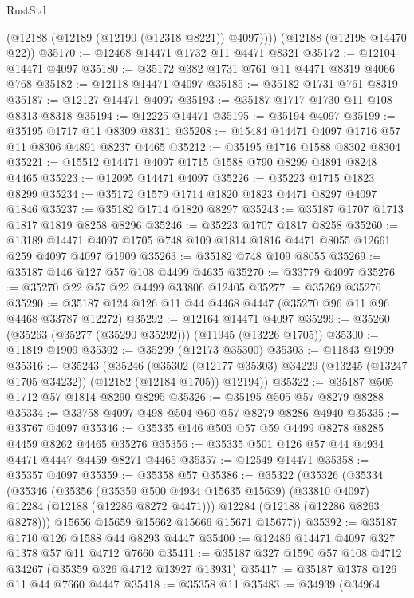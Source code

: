 \begin{lexlean}{RustStd}
\begin{coremodule}
        (@12188 (@12189 (@12190 (@12318 @8221)) @4097))))
    (@12188 (@12198 @14470 @22))
@35170 := @12468 @14471 @1732 @11 @4471 @8321
@35172 := @12104 @14471 @4097
@35180 := @35172 @382 @1731 @761 @11 @4471 @8319 @4066 @768
@35182 := @12118 @14471 @4097
@35185 := @35182 @1731 @761 @8319
@35187 := @12127 @14471 @4097
@35193 := @35187 @1717 @1730 @11 @108 @8313 @8318
@35194 := @12225 @14471
@35195 := @35194 @4097
@35199 := @35195 @1717 @11 @8309 @8311
@35208 := @15484 @14471 @4097 @1716 @57 @11 @8306 @4891 @8237 @4465
@35212 := @35195 @1716 @1588 @8302 @8304
@35221 := @15512 @14471 @4097 @1715 @1588 @790 @8299 @4891 @8248 @4465
@35223 := @12095 @14471 @4097
@35226 := @35223 @1715 @1823 @8299
@35234 := @35172 @1579 @1714 @1820 @1823 @4471 @8297 @4097 @1846
@35237 := @35182 @1714 @1820 @8297
@35243 := @35187 @1707 @1713 @1817 @1819 @8258 @8296
@35246 := @35223 @1707 @1817 @8258
@35260 := @13189 @14471 @4097 @1705 @748 @109 @1814 @1816 @4471 @8055 @12661 @259 @4097 @4097 @1909
@35263 := @35182 @748 @109 @8055
@35269 := @35187 @146 @127 @57 @108 @4499 @4635
@35270 := @33779 @4097
@35276 := @35270 @22 @57 @22 @4499 @33806 @12405
@35277 := @35269 @35276
@35290 := @35187 @124 @126 @11 @44 @4468 @4447 (@35270 @96 @11 @96 @4468 @33787 @12272)
@35292 := @12164 @14471 @4097
@35299 := @35260 (@35263 (@35277 (@35290 @35292))) (@11945 (@13226 @1705))
@35300 := @11819 @1909
@35302 := @35299 (@12173 @35300)
@35303 := @11843 @1909
@35316 := @35243
    (@35246
      (@35302 (@12177 @35303) @34229 (@13245 (@13247 @1705 @34232)) (@12182 (@12184 @1705)) @12194))
@35322 := @35187 @505 @1712 @57 @1814 @8290 @8295
@35326 := @35195 @505 @57 @8279 @8288
@35334 := @33758 @4097 @498 @504 @60 @57 @8279 @8286 @4940
@35335 := @33767 @4097
@35346 := @35335 @146 @503 @57 @59 @4499 @8278 @8285 @4459 @8262 @4465 @35276
@35356 := @35335 @501 @126 @57 @44 @4934 @4471 @4447 @4459 @8271 @4465
@35357 := @12549 @14471
@35358 := @35357 @4097
@35359 := @35358 @57
@35386 := @35322
    (@35326
      (@35334
        (@35346
          (@35356
            (@35359 @500 @4934 @15635 @15639)
            (@33810 @4097)
            @12284
            (@12188 (@12286 @8272 @4471)))
          @12284
          (@12188 (@12286 @8263 @8278)))
        @15656
        @15659
        @15662
        @15666
        @15671
        @15677))
@35392 := @35187 @1710 @126 @1588 @44 @8293 @4447
@35400 := @12486 @14471 @4097 @327 @1378 @57 @11 @4712 @7660
@35411 := @35187 @327 @1590 @57 @108 @4712 @34267 (@35359 @326 @4712 @13927 @13931)
@35417 := @35187 @1378 @126 @11 @44 @7660 @4447
@35418 := @35358 @11
@35483 := @34939
    (@34964

\end{coremodule}
\end{lexlean}
